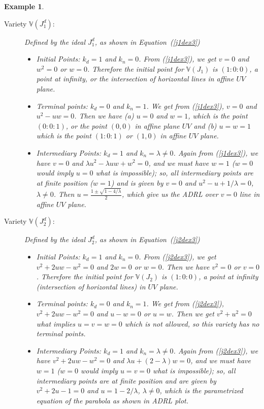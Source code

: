 \documentclass{article}
\newtheorem{example}{Example}[section]
\begin{document}
\begin{example}
\begin{description}
\item[Variety $\mathbb V(J_1^d)$:] Defined by the ideal $J_1^d$, as shown in Equation~(\ref{j1dex3})
\begin{itemize}
\item Initial Points: $k_d=1$ and $k_n=0$. From (\ref{j1dex3}), we get $v=0$ and $w^2=0$ or $w=0$. 
Therefore the initial point 
for $\mathbb V(J_1)$ is $(1:0:0)$, a point at infinity, or the intersection of horizontal lines in affine $UV$ plane.
\item Terminal points: $k_d=0$ and $k_n=1$. We get from (\ref{j1dex3}), $v=0$ and $u^2 - uw=0$. Then we have (a) $u=0$ 
and $w=1$, which is
the point $(0:0:1)$, or the point $(0,0)$ in affine plane $UV$ and (b) $u=w=1$ which is the point $(1:0:1)$ or $(1,0)$ 
in affine $UV$ plane.
\item Intermediary Points: $k_d=1$ and $k_n=\lambda\neq 0$. Again from (\ref{j1dex3}), we have $v=0$ and 
$\lambda u^2 - \lambda uw + w^2=0$,
and we must have $w=1$ ($w=0$ would imply $u=0$ what is impossible); so, all intermediary points are at finite position 
($w=1$) and is given by
$v=0$ and $u^2 - u +1/ \lambda=0$, $\lambda\neq 0$. Then $u=\frac{1\pm\sqrt{1-4/\lambda}}{2}$, which give us the 
ADRL over $v=0$ line in affine $UV$ plane.

\end{itemize}

\item[Variety $\mathbb V(J_2^d)$:] Defined by the ideal $J_2^d$, as shown in Equation~(\ref{j2dex3})
\begin{itemize}
\item Initial Points: $k_d=1$ and $k_n=0$. From (\ref{j2dex3}), we get $v^2 + 2uw - w^2=0$ and $2w=0$ or $w=0$. Then we 
have $v^2=0$
or $v=0$. Therefore the initial point for $\mathbb V(J_2)$ is $(1:0:0)$, a point at infinity (intersection of horizontal 
lines) in $UV$ plane.
\item Terminal points: $k_d=0$ and $k_n=1$. We get from (\ref{j2dex3}), $v^2 + 2uw - w^2=0$ and $u-w=0$ or 
$u=w$. Then we get $v^2 + u^2=0$ what implies $u=v=w=0$ which is not allowed, so this variety has no terminal points.
\item Intermediary Points: $k_d=1$ and $k_n=\lambda\neq 0$. Again from (\ref{j2dex3}), we have $v^2 + 2uw - w^2=0$ and 
$\lambda u +(2 - \lambda)w=0$, and we must have $w=1$ ($w=0$ would imply $u=v=0$ what is impossible); so, all intermediary 
points are at finite position and are given by $v^2 + 2u -1 = 0$ and $u = 1 - 2/\lambda$, $\lambda\neq 0$, which is the 
parametrized equation of the parabola as shown in ADRL plot.


\end{itemize}
\end{description}
\end{example}
\end{document}
